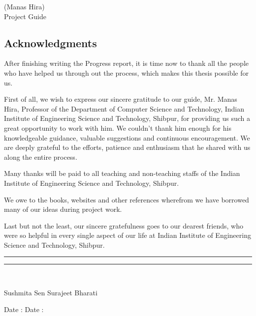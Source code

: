 \documentclass[12pt,oneside,openany,a4paper]{book}
\begin{document}
\begin{flushright}
(Manas Hira)\\
Project Guide
\end{flushright}
\newpage
\begin{center}

\section*{Acknowledgments}
\end{center}
\vspace{0.6cm}
\par
\thispagestyle{empty}
After finishing writing the Progress report, it is time now to thank all the people who have helped us through out the process, which makes this thesis possible for us.
\par \vspace{0.2cm}
First of all, we wish to express our sincere gratitude to our guide, Mr. Manas Hira, Professor of the Department of Computer Science and Technology, Indian Institute of Engineering Science and Technology, Shibpur, for providing us such a great opportunity to work with him. We couldn't thank him enough for his knowledgeable guidance, valuable suggestions and continuous encouragement. We are deeply grateful to the efforts, patience and enthusiasm that he shared with us along the entire process. 
\par \vspace{0.2cm}
Many thanks will be paid to all teaching and non-teaching staffs of the Indian Institute of Engineering Science and Technology, Shibpur.
\par \vspace{0.2cm}
We owe to the books, websites and other references wherefrom we have borrowed many of our ideas during project work.
\par \vspace{0.2cm}
Last but not the least, our sincere gratefulness goes to our dearest friends, who were so helpful in every single aspect of our life at Indian Institute of Engineering Science and Technology, Shibpur.

\vspace{6cm}

\hspace{-0.8cm} \rule[0.1cm]{4.8cm}{0.1mm}  \hfill \rule[0.1cm]{4.8cm}{0.1mm} \\
\par \vspace{-0.5cm}
\hspace{0.3cm} Sushmita Sen         \hspace{6.4cm}   Surajeet Bharati \\ 
\par \vspace{-0.5cm}
\hspace{-0.2cm} Date :               \hspace{7.6cm}    Date :   
\par
\end{document}
